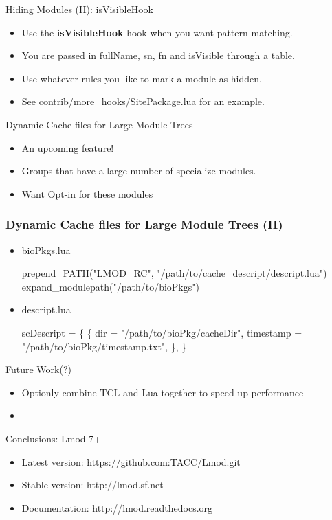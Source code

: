 \documentclass{beamer}
\begin{document}
\begin{frame}{Hiding Modules (II): isVisibleHook}
  \begin{itemize}
     \item Use the {\bf isVisibleHook} hook when you want pattern matching.
     \item You are passed in fullName, sn, fn and isVisible through a
       table.
     \item Use whatever rules you like to mark a module as hidden.
     \item See contrib/more\_hooks/SitePackage.lua for an example.
  \end{itemize}
\end{frame}

\begin{frame}{Dynamic Cache files for Large Module Trees}
  \begin{itemize}
    \item An upcoming feature!
    \item Groups that have a large number of specialize modules.
    \item Want Opt-in for these modules
  \end{itemize}
\end{frame}

\begin{frame}[fragile]
  \frametitle{Dynamic Cache files for Large Module Trees (II)}
  \begin{itemize}
    \item bioPkgs.lua
    {\tiny
\begin{semiverbatim}
  prepend\_PATH("LMOD\_RC", "/path/to/cache\_descript/descript.lua")
  expand\_modulepath("/path/to/bioPkgs")
\end{semiverbatim}
    }
    \item descript.lua
    {\tiny
\begin{semiverbatim}
  scDescript = \{
     \{
        dir = "/path/to/bioPkg/cacheDir",
        timestamp = "/path/to/bioPkg/timestamp.txt",
     \},
  \}
\end{semiverbatim}
    }
    \end{itemize}
\end{frame}

\begin{frame}{Future Work(?)}
  \begin{itemize}
    \item Optionly combine TCL and Lua together to speed up performance
    \item 
  \end{itemize}
\end{frame}


\begin{frame}{Conclusions: Lmod 7+}
  \begin{itemize}
    \item Latest version: https://github.com:TACC/Lmod.git
    \item Stable version: http://lmod.sf.net
    \item Documentation:  http://lmod.readthedocs.org
  \end{itemize}
\end{frame}
\end{document}
